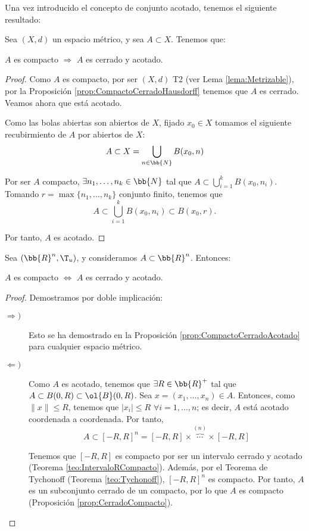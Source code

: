 Una vez introducido el concepto de conjunto acotado, tenemos el siguiente resultado:
\begin{prop}\label{prop:CompactoCerradoAcotado}
    Sea $(X,d)$ un espacio métrico, y sea $A\subset X$. Tenemos que:
    \begin{center}
        $A$ es compacto $\Longrightarrow$ $A$ es cerrado y acotado.
    \end{center}
\end{prop}
\begin{proof}
    Como $A$ es compacto, por ser $(X,d)$ T2 (ver Lema \ref{lema:Metrizable}), por la Proposición \ref{prop:CompactoCerradoHausdorff} tenemos que $A$ es cerrado. Veamos ahora que está acotado.
        
    Como las bolas abiertas son abiertos de $X$, fijado $x_0\in X$ tomamos el siguiente recubirmiento de $A$ por abiertos de $X$:
    \begin{equation*}
        A\subset X = \bigcup_{n \in \bb{N}}B(x_0,n)
    \end{equation*}

    Por ser $A$ compacto, $\exists n_1,\dots,n_k\in \bb{N}$ tal que $A\subset \bigcup\limits_{i=1}^k B(x_0,n_i)$.
    Tomando $r=\max\{n_1,\dots,n_k\}$ conjunto finito, tenemos que $$A\subset \bigcup\limits_{i=1}^k B(x_0,n_i) \subset B(x_0,r).$$
    
    Por tanto, $A$ es acotado.
\end{proof}

\begin{coro} \label{coro:HeineBorel}
    Sea $(\bb{R}^n,\T_u)$, y consideramos $A\subset \bb{R}^n$. Entonces:
    \begin{center}
        $A$ es compacto $\Longleftrightarrow$ $A$ es cerrado y acotado.
    \end{center}
\end{coro}
\begin{proof}
    Demostramos por doble implicación:
    \begin{description}
        \item[$\Longrightarrow)$] Esto se ha demostrado en la Proposición \ref{prop:CompactoCerradoAcotado} para cualquier espacio métrico.
        \item[$\Longleftarrow)$] Como $A$ es acotado, tenemos que $\exists R\in \bb{R}^+$ tal que $A\subset B(0,R)\subset \ol{B}(0,R)$. Sea $x=(x_1,\dots,x_n)\in A$.
        Entonces, como $\|x\|\leq R$, tenemos que $|x_i|\leq R$ $\forall i=1,\dots,n$; es decir, $A$ está acotado coordenada a coordenada. Por tanto,
        \begin{equation*}
            A\subset [-R,R]^n = [-R,R] \times \overbrace{\cdots}^{(n)} \times [-R,R]
        \end{equation*}

        Tenemos que $[-R,R]$ es compacto por ser un intervalo cerrado y acotado (Teorema \ref{teo:IntervaloRCompacto}).
        Además, por el Teorema de Tychonoff (Teorema \ref{teo:Tychonoff}), $[-R,R]^n$ es compacto.
        Por tanto, $A$ es un subconjunto cerrado de un compacto, por lo que $A$ es compacto (Proposición \ref{prop:CerradoCompacto}).
    \end{description}
\end{proof}

